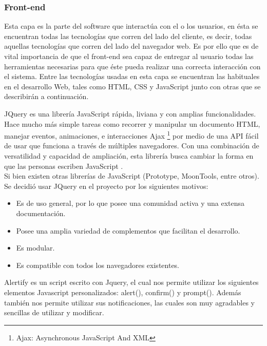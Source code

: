 \subsubsection{Front-end}

Esta capa es la parte del software que interactúa con el o los usuarios, en ésta  se encuentran todas las tecnologías que corren del lado del cliente, es decir, todas aquellas tecnologías que corren del lado del navegador web. Es por ello que es de vital importancia de que el front-end sea capaz de entregar  al usuario todas las herramientas necesarias para que éste pueda realizar una correcta interacción con el sistema. Entre las tecnologías usadas en esta capa se encuentran las habituales en el desarrollo Web, tales como HTML, CSS y JavaScript junto con otras que se describirán a continuación.


JQuery es una librería JavaScript rápida, liviana y con amplias funcionalidades. Hace mucho más simple tareas como recorrer y manipular un documento HTML, manejar eventos, animaciones, e interacciones Ajax	\footnote{Ajax: Asynchronous JavaScript And XML} por medio de una API fácil de usar que funciona a través de múltiples navegadores. Con una combinación de versatilidad y capacidad de ampliación, esta librería busca cambiar la forma en que las personas escriben JavaScript \cite{JQu15}.
\\

Si bien existen otras librerías de JavaScript (Prototype, MoonTools, entre otros). Se decidió usar JQuery en el proyecto por los siguientes motivos:
\begin{itemize}
	\item Es de uso general, por lo que posee una comunidad activa y una extensa documentación.
	\item Posee una amplia variedad de complementos que facilitan el desarrollo.
	\item Es modular.
	\item Es compatible con todos los navegadores existentes.
\end{itemize}



Alertify es un script escrito con Jquery, el cual nos permite utilizar los siguientes elementos Javascript personalizados: alert(), confirm() y prompt(). Además también nos permite utilizar sus notificaciones, las cuales son muy agradables y sencillas de utilizar y modificar\cite{ALE15}.
\\

